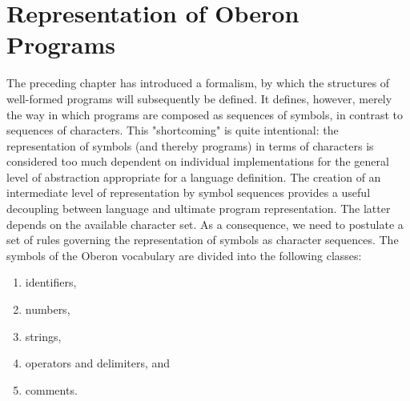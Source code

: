 \chapter{Representation of Oberon Programs}
The preceding chapter has introduced a formalism, by which the structures of well-formed
programs will subsequently be defined. It defines, however, merely the way in which programs are
composed as sequences of symbols, in contrast to sequences of characters. This "shortcoming" is
quite intentional: the representation of symbols (and thereby programs) in terms of characters is
considered too much dependent on individual implementations for the general level of abstraction
appropriate for a language definition. The creation of an intermediate level of representation by
symbol sequences provides a useful decoupling between language and ultimate program
representation. The latter depends on the available character set. As a consequence, we need to
postulate a set of rules governing the representation of symbols as character sequences. The
symbols of the Oberon vocabulary are divided into the following classes:
\begin{enumerate}
  \item identifiers,
  \item numbers,
  \item strings,
  \item operators and delimiters, and
  \item comments.
\end{enumerate}

